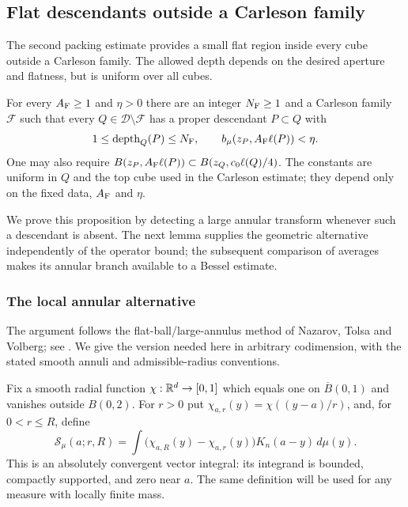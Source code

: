 \subsection{Flat descendants outside a Carleson family}

The second packing estimate provides a small flat region inside every
cube outside a Carleson family. The allowed depth depends on the desired
aperture and flatness, but is uniform over all cubes.

\begin{proposition}\label{prop:flat-seeds}
For every $A_{\rm F}\ge1$ and $\eta>0$ there are an integer $N_{\rm F}\ge1$
and a Carleson family $\mathcal F$ such that every
$Q\in\mathcal D\setminus\mathcal F$ has a proper descendant $P\subset Q$
with
\begin{equation}\label{eq:flat-seed-conclusion}
 1\le\operatorname{depth}_Q(P)\le N_{\rm F},
 \qquad b_\mu(z_P,A_{\rm F}\ell(P))<\eta.
\end{equation}
One may also require
$B(z_P,A_{\rm F}\ell(P))\subset B(z_Q,c_0\ell(Q)/4)$.
The constants are uniform in $Q$ and the top cube used in the Carleson
estimate; they depend only on the fixed data, $A_{\rm F}$ and $\eta$.
\end{proposition}

We prove this proposition by detecting a large annular transform whenever
such a descendant is absent. The next lemma supplies the geometric
alternative independently of the operator bound; the subsequent
comparison of averages makes its annular branch available to a Bessel
estimate.

\subsubsection{The local annular alternative}

The argument follows the flat-ball/large-annulus method of Nazarov,
Tolsa and Volberg; see \cite[Section~10]{NazarovTolsaVolberg2014}.
We give the version needed here in arbitrary codimension, with the
stated smooth annuli and admissible-radius conventions.

Fix a smooth radial function $\chi:\mathbb R^d\to[0,1]$ which equals one
on $\overline B(0,1)$ and vanishes outside $B(0,2)$.  For $r>0$ put
$\chi_{a,r}(y)=\chi((y-a)/r)$, and, for $0<r\leq R$, define
\begin{equation}\label{eq:smooth-annular-transform}
 \mathcal S_\mu(a;r,R)
   =\int \bigl(\chi_{a,R}(y)-\chi_{a,r}(y)\bigr)
                 K_n(a-y)\,d\mu(y).
\end{equation}
This is an absolutely convergent vector integral: its integrand is
bounded, compactly supported, and zero near $a$.  The same definition
will be used for any measure with locally finite mass.

